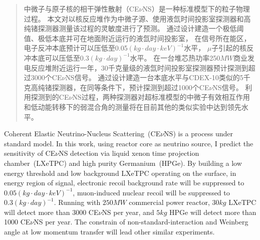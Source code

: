 

\begin{abstract}
  中微子与原子核的相干弹性散射（CE$\nu$NS）是一种标准模型下的粒子物理过程。
  本文对以核反应堆作为中微子源、使用液氙时间投影室探测器和高纯锗探测器测量该过程的灵敏度进行了预测。
  通过设计建造一个极低阈值、极低本底并可在地面附近运行的液氙时间投影室，
  在信号所在能区，电子反冲本底预计可以压低至0.05$\left(\si{kg}\cdot\si{day}\cdot\si{keV}\right)^{-1}$水平，
  $\mu$子引起的核反冲本底可以压低至0.3$\left(\si{kg}\cdot\si{day}\right)^{-1}$水平。
  在一台堆芯热功率250$\si{MW}$商业发电反应堆附近运行一年，30千克量级的液氙时间投影室探测器预计探测到超过3000个CE$\nu$NS信号。
  通过设计建造一台本底水平与CDEX-10类似的5千克高纯锗探测器，在同等条件下，预计探测到超过1000个CE$\nu$NS信号。
  利用探测到的CE$\nu$NS过程，两种探测器对超标准模型的中微子有效相互作用和低动能转移下的弱混合角的测量将在目前其他的类似实验中达到领先水平。

\end{abstract}

\begin{abstract*}
  Coherent Elastic Neutrino-Nucleus Scattering~(CE$\nu$NS) is a process under standard model.
  In this work, using reactor core as neutrino source, 
  I predict the sensitivity of CE$\nu$NS detection via liquid xenon time projection chamber~(LXeTPC) and high purity Germanium~(HPGe).
  By building a low energy threshold and low background LXeTPC operating on the surface,
  in energy region of signal, electronic recoil background rate will be suppressed to $0.05\left(\si{kg}\cdot\si{day}\cdot\si{keV}\right)^{-1}$,
  muon-induced nuclear recoil will be suppressed to $0.3\left(\si{kg}\cdot\si{day}\right)^{-1}$. 
  Running with $250\si{MW}$ commercial power reactor, $30\si{kg}$ LXeTPC will detect more than 3000 CE$\nu$NS per year, 
  and $5\si{kg}$ HPGe will detect more than 1000 CE$\nu$NS per year. 
  The constrain of non-standard-interaction and Weinberg angle at low momentum transfer will lead other similar experiments.

\end{abstract*}
